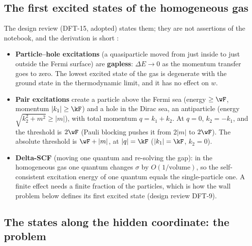 \subsection{The first excited states of the homogeneous gas}
\label{sec:8.2}

The design review (DFT-15, adopted) states them; they are not assertions of the notebook, and the
derivation is short \cfderived:
\begin{itemize}
  \item \textbf{Particle--hole excitations} (a quasiparticle moved from just inside to just outside the
        Fermi surface) are \textbf{gapless}: $\Delta E\to0$ as the momentum transfer goes to zero. The
        lowest excited state of the gas is degenerate with the ground state in the thermodynamic limit,
        and it has no effect on $w$.
  \item \textbf{Pair excitations} create a particle above the Fermi sea (energy $\geq\wF$, momentum
        $|k_1|\geq\kF$) and a hole in the Dirac sea, an antiparticle (energy $\sqrt{k_2^2+m^2}\geq|m|$), with
        total momentum $q=k_1+k_2$. At $q=0$, $k_2=-k_1$, and the threshold is $2\wF$ (Pauli blocking
        pushes it from $2|m|$ to $2\wF$). The absolute threshold is $\wF+|m|$, at $|q|=\kF$ ($|k_1|=\kF$,
        $k_2=0$).
  \item \textbf{Delta-SCF} (moving one quantum and re-solving the gap): in the homogeneous gas one quantum
        changes $\sigma$ by $O(1/\text{volume})$, so the self-consistent excitation energy of one quantum
        equals the single-particle one. A finite effect needs a finite fraction of the particles, which is
        how the wall problem below defines its first excited state (design review DFT-9).
\end{itemize}

\subsection[{The states along the hidden coordinate: the problem [WG 2]}]{The states along the hidden coordinate: the problem }
\label{sec:8.3}

